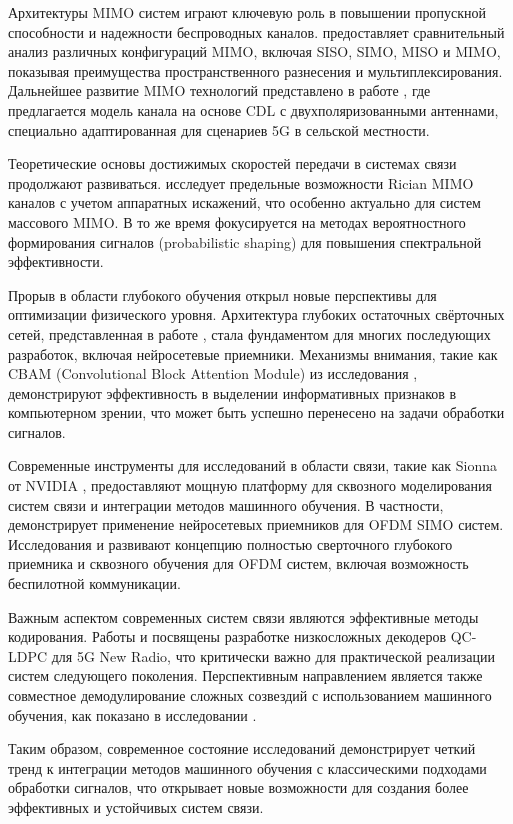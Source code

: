 \documentclass{article}
\begin{document}
Архитектуры MIMO систем играют ключевую роль в повышении пропускной способности и надежности беспроводных каналов. \citet{shah2017performance} предоставляет сравнительный анализ различных конфигураций MIMO, включая SISO, SIMO, MISO и MIMO, показывая преимущества пространственного разнесения и мультиплексирования. Дальнейшее развитие MIMO технологий представлено в работе \citet{pessoa2020cdl}, где предлагается модель канала на основе CDL с двухполяризованными антеннами, специально адаптированная для сценариев 5G в сельской местности.

Теоретические основы достижимых скоростей передачи в системах связи продолжают развиваться. \citet{bjornson2015achievable} исследует предельные возможности Rician MIMO каналов с учетом аппаратных искажений, что особенно актуально для систем массового MIMO. В то же время \citet{caire2017achievable} фокусируется на методах вероятностного формирования сигналов (probabilistic shaping) для повышения спектральной эффективности.

Прорыв в области глубокого обучения открыл новые перспективы для оптимизации физического уровня. Архитектура глубоких остаточных свёрточных сетей, представленная в работе \citet{he2016deep}, стала фундаментом для многих последующих разработок, включая нейросетевые приемники. Механизмы внимания, такие как CBAM (Convolutional Block Attention Module) из исследования \citet{woo2018cbam}, демонстрируют эффективность в выделении информативных признаков в компьютерном зрении, что может быть успешно перенесено на задачи обработки сигналов.

Современные инструменты для исследований в области связи, такие как Sionna от NVIDIA \citep{sionna}, предоставляют мощную платформу для сквозного моделирования систем связи и интеграции методов машинного обучения. В частности, \citet{sionna2023neural} демонстрирует применение нейросетевых приемников для OFDM SIMO систем. Исследования \citet{levis2020deeprx} и \citet{levis2020end} развивают концепцию полностью сверточного глубокого приемника и сквозного обучения для OFDM систем, включая возможность беспилотной коммуникации.

Важным аспектом современных систем связи являются эффективные методы кодирования. Работы \citet{nguyen2019efficient} и \citet{nguyen2021low} посвящены разработке низкосложных декодеров QC-LDPC для 5G New Radio, что критически важно для практической реализации систем следующего поколения. Перспективным направлением является также совместное демодулирование сложных созвездий с использованием машинного обучения, как показано в исследовании \citet{gansekoele2025joint}.

Таким образом, современное состояние исследований демонстрирует четкий тренд к интеграции методов машинного обучения с классическими подходами обработки сигналов, что открывает новые возможности для создания более эффективных и устойчивых систем связи.


\clearpage


\end{document}
